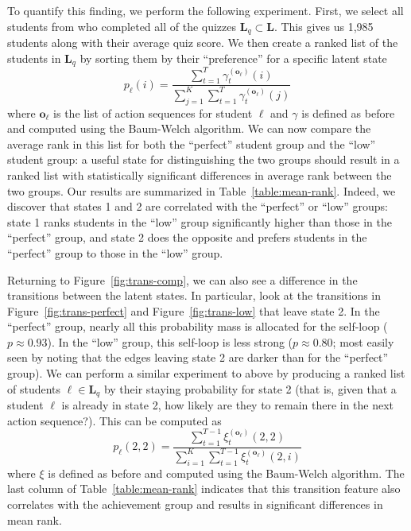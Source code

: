 To quantify this finding, we perform the following experiment. First, we
select all students from \textretrieval{} who completed all of the quizzes
$\mathbf{L}_q \subset \mathbf{L}$. This gives us 1,985 students along with
their average quiz score. We then create a ranked list of the students in
$\mathbf{L}_q$ by sorting them by their ``preference'' for a specific
latent state
\begin{equation}
  p_\ell(i) = \frac{\sum_{t=1}^T \gamma_t^{(\mathbf{o}_\ell)}(i)}
  {\sum_{j=1}^{K} \sum_{t=1}^T \gamma_t^{(\mathbf{o}_\ell)}(j)}
\end{equation}
where $\mathbf{o}_\ell$ is the list of action sequences for student $\ell$
and $\gamma$ is defined as before and computed using the Baum-Welch
algorithm. We can now compare the average rank in this list for both
the ``perfect'' student group and the ``low'' student group: a useful state
for distinguishing the two groups should result in a ranked list with
statistically significant differences in average rank between the two
groups. Our results are summarized in Table~\ref{table:mean-rank}. Indeed,
we discover that states 1 and 2 are correlated with the ``perfect'' or
``low'' groups: state 1 ranks students in the ``low'' group significantly higher
than those in the ``perfect'' group, and state 2 does the opposite and
prefers students in the ``perfect'' group to those in the ``low'' group.

Returning to Figure~\ref{fig:trans-comp}, we can also see a difference in
the transitions between the latent states. In particular, look at the
transitions in Figure~\ref{fig:trans-perfect} and
Figure~\ref{fig:trans-low} that leave state 2. In the ``perfect'' group,
nearly all this probability mass is allocated for the self-loop ($p
\approx 0.93$). In the ``low'' group, this self-loop is less strong ($p
\approx 0.80$; most easily seen by noting that the edges leaving state 2
are darker than for the ``perfect'' group). We can perform a similar
experiment to above by producing a ranked list of students $\ell \in
\mathbf{L}_q$ by their staying probability for state 2 (that is, given that
a student $\ell$ is already in state 2, how likely are they to remain there
in the next action sequence?). This can be computed as
\begin{equation}
  p_\ell(2, 2) = \frac{\sum_{t=1}^{T-1} \xi_t^{(\mathbf{o}_\ell)}(2,2)}
  {\sum_{i=1}^K \sum_{t=1}^{T-1} \xi_t^{(\mathbf{o}_\ell)}(2,i)}
\end{equation}
where $\xi$ is defined as before and computed using the Baum-Welch
algorithm. The last column of Table~\ref{table:mean-rank} indicates that
this transition feature also correlates with the achievement group and
results in significant differences in mean rank.
